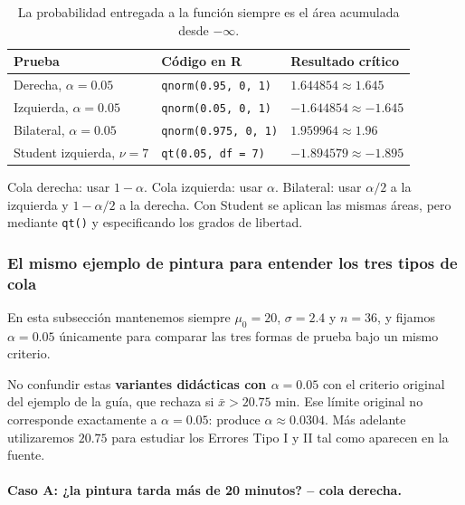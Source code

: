 \documentclass[11pt,a4paper]{article}
\begin{document}
\begin{table}[H]
\centering
\small
\begin{tabularx}{\textwidth}{p{3.2cm}p{5.0cm}X}
\toprule
Prueba & Código en R & Resultado crítico\\
\midrule
Derecha, $\alpha=0.05$ & \texttt{qnorm(0.95, 0, 1)} & $1.644854\approx1.645$\\
Izquierda, $\alpha=0.05$ & \texttt{qnorm(0.05, 0, 1)} & $-1.644854\approx-1.645$\\
Bilateral, $\alpha=0.05$ & \texttt{qnorm(0.975, 0, 1)} & $1.959964\approx1.96$\\
Student izquierda, $\nu=7$ & \texttt{qt(0.05, df = 7)} & $-1.894579\approx-1.895$\\
\bottomrule
\end{tabularx}
\caption{La probabilidad entregada a la función siempre es el área acumulada desde $-\infty$.}
\end{table}

\begin{regla}
Cola derecha: usar $1-\alpha$. Cola izquierda: usar $\alpha$. Bilateral: usar $\alpha/2$ a la izquierda y $1-\alpha/2$ a la derecha. Con Student se aplican las mismas áreas, pero mediante \texttt{qt()} y especificando los grados de libertad.
\end{regla}

\subsubsection{El mismo ejemplo de pintura para entender los tres tipos de cola}

En esta subsección mantenemos siempre $\mu_0=20$, $\sigma=2.4$ y $n=36$, y fijamos \textbf{$\alpha=0.05$} únicamente para comparar las tres formas de prueba bajo un mismo criterio.

\begin{aclaracion}
No confundir estas \textbf{variantes didácticas con $\alpha=0.05$} con el criterio original del ejemplo de la guía, que rechaza si $\bar{x}>20.75$ min. Ese límite original no corresponde exactamente a $\alpha=0.05$: produce $\alpha\approx0.0304$. Más adelante utilizaremos $20.75$ para estudiar los Errores Tipo I y II tal como aparecen en la fuente.
\end{aclaracion}

\paragraph{Caso A: ¿la pintura tarda más de 20 minutos? -- cola derecha.}
\end{document}
